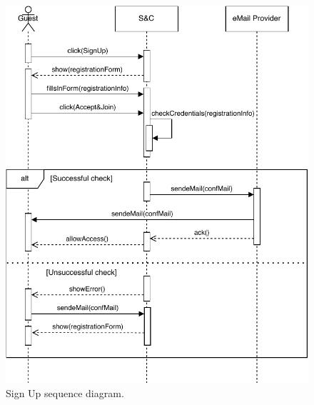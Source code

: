 \begin{figure}[H]
    \begin{center}
        \includegraphics[width=\linewidth]{Images/SequenceDiagram/SignUpSD.pdf}
        \caption{Sign Up sequence diagram.}
        \label{fig:sign_up_seqdiag}%
    \end{center}
\end{figure}

\newpage

